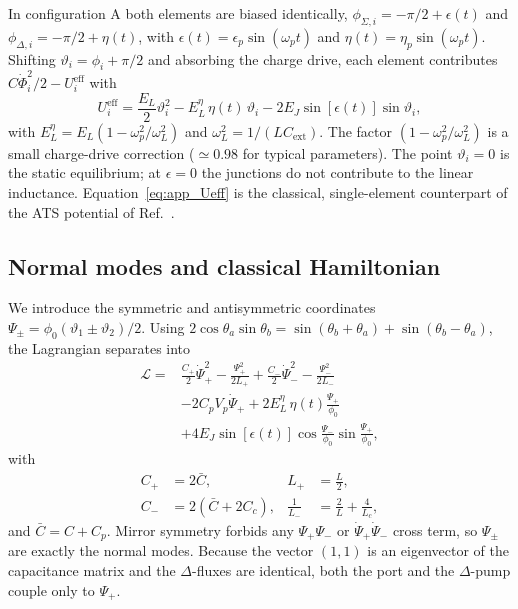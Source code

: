 \documentclass[aps,prx,reprint,floatfix,amsmath,amssymb,longbibliography]{revtex4-2}
\begin{document}
In configuration A both elements are biased identically,
$\phi_{\Sigma,i}=-\pi/2+\epsilon(t)$ and $\phi_{\Delta,i}=-\pi/2+\eta(t)$,
with $\epsilon(t)=\epsilon_p\sin(\omega_p t)$ and
$\eta(t)=\eta_p\sin(\omega_p t)$. Shifting $\vartheta_i=\phi_i+\pi/2$ and
absorbing the charge drive, each element contributes
$C\dot{\Phi}_i^2/2-U_i^{\mathrm{eff}}$ with
\begin{equation}
  U_i^{\mathrm{eff}}=\frac{E_L}{2}\vartheta_i^2-E_L^\eta\,\eta(t)\,\vartheta_i
  -2E_J\sin[\epsilon(t)]\sin\vartheta_i,
  \label{eq:app_Ueff}
\end{equation}
with $E_L^\eta=E_L(1-\omega_p^2/\omega_L^2)$ and $\omega_L^2=1/(LC_{\mathrm{ext}})$. The factor
$(1-\omega_p^2/\omega_L^2)$ is a small charge-drive correction
($\simeq0.98$ for typical parameters). The point $\vartheta_i=0$ is the
static equilibrium; at $\epsilon=0$ the junctions do not contribute to the
linear inductance. Equation~\eqref{eq:app_Ueff} is the classical,
single-element counterpart of the ATS potential of
Ref.~\cite{Carde2025Feb}.

\subsection{Normal modes and classical Hamiltonian}

We introduce the symmetric and antisymmetric coordinates
$\Psi_\pm=\phi_0(\vartheta_1\pm\vartheta_2)/2$. Using
$2\cos\theta_a\sin\theta_b=\sin(\theta_b+\theta_a)+\sin(\theta_b-\theta_a)$,
the Lagrangian separates into
\begin{equation}
\begin{aligned}
  \mathcal{L}={}&\frac{C_+}{2}\dot{\Psi}_+^2-\frac{\Psi_+^2}{2L_+}
  +\frac{C_-}{2}\dot{\Psi}_-^2-\frac{\Psi_-^2}{2L_-}\\
  &-2C_pV_p\dot{\Psi}_+
  +2E_L^\eta\,\eta(t)\frac{\Psi_+}{\phi_0}\\
  &+4E_J\sin[\epsilon(t)]\cos\frac{\Psi_-}{\phi_0}\sin\frac{\Psi_+}{\phi_0},
\end{aligned}
\label{eq:app_Lnormal}
\end{equation}
with
\begin{equation}
\begin{aligned}
  C_+&=2\bar{C}, & L_+&=\frac{L}{2},\\
  C_-&=2(\bar{C}+2C_c), & \frac{1}{L_-}&=\frac{2}{L}+\frac{4}{L_c},
\end{aligned}
\end{equation}
and $\bar{C}=C+C_p$. Mirror symmetry forbids any $\Psi_+\Psi_-$ or
$\dot{\Psi}_+\dot{\Psi}_-$ cross term, so $\Psi_\pm$ are exactly the
normal modes. Because the vector $(1,1)$ is an eigenvector of the
capacitance matrix and the $\Delta$-fluxes are identical, both the port
and the $\Delta$-pump couple only to $\Psi_+$.
\end{document}
